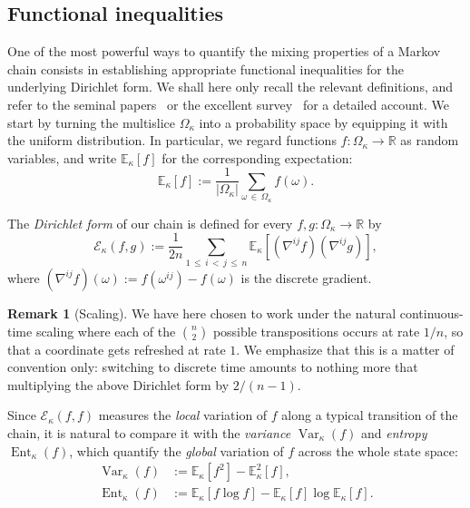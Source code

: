 \documentclass[10pt]{amsart}
\theoremstyle{definition}\newtheorem{defi}[theo]{Definition}\newtheorem{rema}[theo]{Remark}\newtheorem{exam}[theo]{Example}\newtheorem{exem}[theo]{Example}\newtheorem{nota}[theo]{Notation}
\newcommand{\R}{\mathbb{R}}
\newcommand{\EE}{\mathbb{E}}
\newcommand{\cE}{\mathcal{E}}
\DeclareMathOperator{\ent}{Ent}
\DeclareMathOperator{\var}{Var}
\begin{document}
\subsection{Functional inequalities}
One of the most powerful ways to quantify the mixing properties of a Markov chain consists in establishing appropriate functional inequalities for the underlying {Dirichlet form}. We shall here only recall the relevant definitions, and refer to the seminal papers~\cite{MR2120475,MR1410112} or the excellent survey~\cite{MR2341319} for a detailed account. We start by turning the multislice $\Omega_\kappa$ into a probability space by equipping it with the uniform distribution. In particular, we regard functions $f\colon\Omega_\kappa\to\R$ as random variables, and write $\EE_\kappa[f]$ for the corresponding expectation:
\[
\EE_\kappa[f] := \frac{1}{\left|\Omega_\kappa\right|}\sum_{\omega\,\in\,\Omega_\kappa}f(\omega).
\]

The \emph{Dirichlet form} of our chain is defined for every $f,g\colon\Omega_\kappa\to\R$ by
\begin{equation}\label{def:dir}
\cE_\kappa\left(f,g\right) := \frac{1}{2n}\sum_{1\,\le\,i\,<\,j\,\le\,n}\EE_\kappa\left[\left(\nabla^{ij}f\right)\left(\nabla^{ij}g\right)\right],
\end{equation}
where $(\nabla^{ij}f)(\omega):=f(\omega^{ij})-f(\omega)$ is the discrete gradient.

\begin{rema}[Scaling]
We have here chosen to work under the natural continu\-ous-time scaling where each of the $\binom{n}{2}$ possible transpositions occurs at rate $1/n$, so that a coordinate gets refreshed at rate $1$. We emphasize that this is a matter of convention only: switching to discrete time amounts to nothing more that multiplying the above Dirichlet form by $2/(n-1)$.
\end{rema}

Since $\cE_\kappa(f,f)$ measures the \emph{local} variation of $f$ along a typical transition of the chain, it is natural to compare it with the \emph{variance} $\var_\kappa(f)$ and \emph{entropy} $\ent_\kappa(f)$, which quantify the \emph{global} variation of $f$ across the whole state space:
\begin{align*}
\var_\kappa(f) & := \EE_\kappa\left[f^2\right]-\EE^2_\kappa[f],\\
\ent_\kappa(f) & := \EE_\kappa\left[f\log f\right]-\EE_\kappa[f]\log\EE_\kappa[f].
\end{align*}
\end{document}
